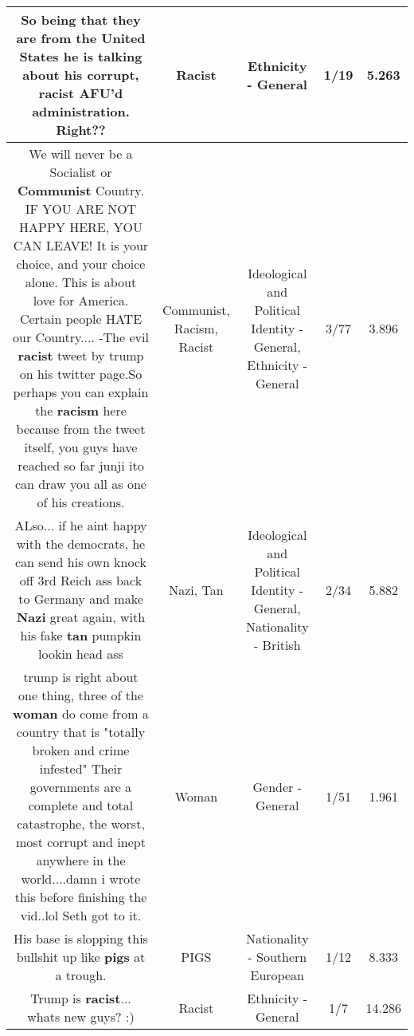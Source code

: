 \documentclass[11pt]{article}
\newlength\mylength
\begin{document}
\begin{center}
\begin{longtable}{|C{.65\mylength}|C{.30\mylength}|C{.12\mylength}|C{.12\mylength}|C{.12\mylength}|}
  \small So being that they are from the United States he is talking about his corrupt, \textbf{racist} AFU'd administration. Right??\normalsize   & Racist & Ethnicity - General & 1/19 & 5.263 \\  \hline
  \small We will never be a Socialist or \textbf{Communist} Country. IF YOU ARE NOT HAPPY HERE, YOU CAN LEAVE! It is your choice, and your choice alone. This is about love for America. Certain people HATE our Country.... -The evil \textbf{racist} tweet by trump on his twitter page.So perhaps you can explain the \textbf{racism} here because from the tweet itself, you guys have reached so far junji ito can draw you all as one of his creations.\normalsize   & Communist, Racism, Racist &  Ideological and Political Identity - General, Ethnicity - General & 3/77 & 3.896 \\  \hline
  \small ALso... if he aint happy with the democrats, he can send his own knock off 3rd Reich ass back to Germany and make \textbf{Nazi} great again, with his fake \textbf{tan} pumpkin lookin head ass\normalsize   & Nazi, Tan &  Ideological and Political Identity - General, Nationality - British & 2/34 & 5.882 \\  \hline
  \small trump is right about one thing, three of the \textbf{woman} do come from a country that is "totally broken and crime infested" Their governments are a complete and total catastrophe, the worst, most corrupt and inept anywhere in the world....damn i wrote this before finishing the vid..lol Seth got to it.\normalsize   & Woman & Gender - General & 1/51 & 1.961 \\  \hline
  \small His base is slopping this bullshit up like \textbf{pigs} at a trough.\normalsize   & PIGS & Nationality - Southern European & 1/12 & 8.333 \\  \hline
  \small Trump is \textbf{racist}... whats new guys? :)\normalsize   & Racist & Ethnicity - General & 1/7 & 14.286 \\  \hline

\end{longtable}
\end{center}
\end{document}
